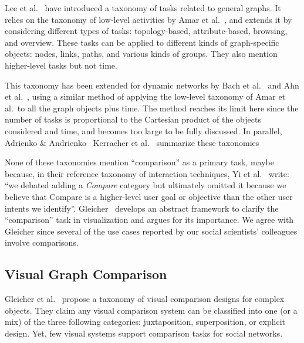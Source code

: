 Lee et al.~\cite{lee:hal-00851754} have introduced a taxonomy of tasks related to general graphs.
It relies on the taxonomy of low-level activities by Amar et al.~\cite{Amar05}, and extends it by considering different types of tasks: topology-based, attribute-based, browsing, and overview. These tasks can be applied to different kinds of graph-specific objects: nodes, links, paths, and various kinds of groups.
They also mention higher-level tasks but not time.

This taxonomy has been extended for dynamic networks by Bach et al.~\cite{bach:hal-00906597} and Ahn et al.~\cite{Ahn14}, using a similar method of applying the low-level taxonomy of Amar et al.\ to all the graph objects plus time. The method reaches its limit here since the number of tasks is proportional to the Cartesian product of the objects considered and time, and becomes too large to be fully discussed.
In parallel, Adrienko \& Andrienko~\cite{andrienko2006exploratory}
Kerracher et al.~\cite{Kerracher15} summarize these taxonomies 

None of these taxonomies mention ``comparison'' as a primary task, maybe because, in their reference taxonomy of interaction techniques, Yi et al.~\cite{yiDeeperUnderstandingRole2007} write: ``we debated adding a \emph{Compare} category but ultimately
omitted it because we believe that Compare is a higher-level user goal or objective than the other user intents we identify''. Gleicher~\cite{Gleicher18, gleicherVisualComparisonInformation2011} develops an abstract framework to clarify the ``comparison'' task in visualization and argues for its importance.
We agree with Gleicher since several of the use cases reported by our social scientists' colleagues involve comparisons.
\fi

\subsection{Visual Graph Comparison}

Gleicher et al.~\cite{Gleicher18} propose a taxonomy of visual comparison designs for complex objects. They claim any visual comparison system can be classified into one (or a mix) of the three following categories: juxtaposition, superposition, or explicit design.
Yet, few visual systems support comparison tasks for social networks.

